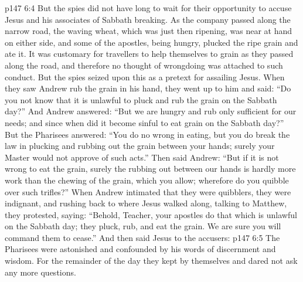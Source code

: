 \vs p147 6:4 But the spies did not have long to wait for their opportunity to accuse Jesus and his associates of Sabbath breaking. As the company passed along the narrow road, the waving wheat, which was just then ripening, was near at hand on either side, and some of the apostles, being hungry, plucked the ripe grain and ate it. It was customary for travellers to help themselves to grain as they passed along the road, and therefore no thought of wrongdoing was attached to such conduct. But the spies seized upon this as a pretext for assailing Jesus. When they saw Andrew rub the grain in his hand, they went up to him and said: “Do you not know that it is unlawful to pluck and rub the grain on the Sabbath day?” And Andrew answered: “But we are hungry and rub only sufficient for our needs; and since when did it become sinful to eat grain on the Sabbath day?” But the Pharisees answered: “You do no wrong in eating, but you do break the law in plucking and rubbing out the grain between your hands; surely your Master would not approve of such acts.” Then said Andrew: “But if it is not wrong to eat the grain, surely the rubbing out between our hands is hardly more work than the chewing of the grain, which you allow; wherefore do you quibble over such trifles?” When Andrew intimated that they were quibblers, they were indignant, and rushing back to where Jesus walked along, talking to Matthew, they protested, saying: “Behold, Teacher, your apostles do that which is unlawful on the Sabbath day; they pluck, rub, and eat the grain. We are sure you will command them to cease.” And then said Jesus to the accusers: 
\vs p147 6:5 The Pharisees were astonished and confounded by his words of discernment and wisdom. For the remainder of the day they kept by themselves and dared not ask any more questions.
